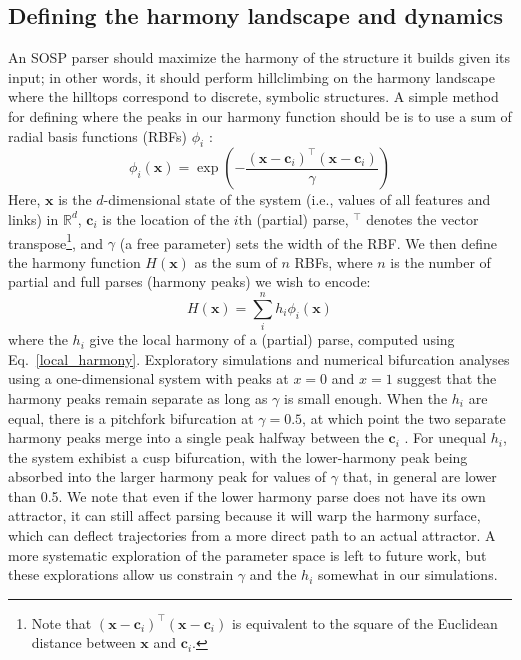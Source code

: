 \documentclass[10pt,letterpaper]{article}
\begin{document}
\subsection{Defining the harmony landscape and dynamics}
An SOSP parser should maximize the harmony of the structure it builds given its input; in other words, it should perform hillclimbing on the harmony landscape where the hilltops correspond to discrete, symbolic structures. A simple method for defining where the peaks in our harmony function should be is to use a sum of radial basis functions (RBFs) $\phi_i$ \cite{han1989convergence, ciocoiu1996analog, ciocoiu2009invariant, muezzinoglu2006rbf}:
$$
\phi_i(\mathbf{x}) = \exp\left(-\frac{(\mathbf{x} - \mathbf{c}_i)^\intercal(\mathbf{x} - \mathbf{c}_i)}{\gamma}\right)
$$
Here, $\mathbf{x}$ is the $d$-dimensional state of the system (i.e., values of all features and links) in $\mathbb{R}^d$, $\mathbf{c}_i$ is the location of the $i$th (partial) parse, $^\intercal$ denotes the vector transpose\footnote{Note that $(\mathbf{x} - \mathbf{c}_i)^\intercal(\mathbf{x} - \mathbf{c}_i)$ is equivalent to the square of the Euclidean distance between $\mathbf{x}$ and $\mathbf{c}_i$.}, and $\gamma$ (a free parameter) sets the width of the RBF. We then define the harmony function $H(\mathbf{x})$ as the sum of $n$ RBFs, where $n$ is the number of partial and full parses (harmony peaks) we wish to encode:
\begin{equation}\label{harmony}
H(\mathbf{x}) = \sum_{i}^{n} h_i \phi_i(\mathbf{x})
\end{equation}
where the $h_i$ give the local harmony of a (partial) parse, computed using Eq.~\ref{local_harmony}. Exploratory simulations and numerical bifurcation analyses \cite{meijer2009numerical} using a one-dimensional system with peaks at $x = 0$ and $x = 1$ suggest that the harmony peaks remain separate as long as $\gamma$ is small enough. When the $h_i$ are equal, there is a pitchfork bifurcation at $\gamma = 0.5$, at which point the two separate harmony peaks merge into a single peak halfway between the $\mathbf{c}_i$ \cite[report a similar finding]{muezzinoglu2006rbf}. For unequal $h_i$, the system exhibist a cusp bifurcation, with the lower-harmony peak being absorbed into the larger harmony peak for values of $\gamma$ that, in general are lower than 0.5. We note that even if the lower harmony parse does not have its own attractor, it can still affect parsing because it will warp the harmony surface, which can deflect trajectories from a more direct path to an actual attractor. A more systematic exploration of the parameter space is left to future work, but these explorations allow us constrain $\gamma$ and the $h_i$ somewhat in our simulations.
\end{document}
